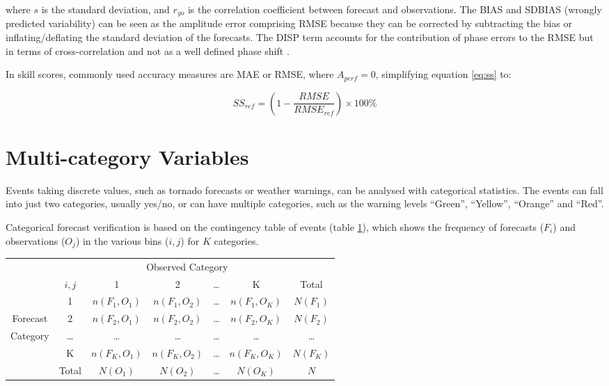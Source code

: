 where $s$ is the standard deviation, and $r_{yo}$ is the correlation coefficient between forecast and observations. The BIAS and SDBIAS (wrongly predicted variability) can be seen as the amplitude error comprising RMSE because they can be corrected by subtracting the bias or inflating/deflating the standard deviation of the forecasts. The DISP term accounts for the contribution of phase errors to the RMSE but in terms of cross-correlation and not as a well defined phase shift \citep{Lange2005}.

In skill scores, commonly used accuracy measures are MAE or RMSE, where $A_{perf}=0$, simplifying equation \ref{eq:ss} to:

\begin{equation}
    SS_{ref} = \left( 1 - \frac{RMSE}{RMSE_{ref}} \right) \times 100\%
    \label{eq:ss_rmse}
\end{equation}


\section{Multi-category Variables} 
\label{sec:verif_mcat}

Events taking discrete values, such as tornado forecasts or weather warnings, can be analysed with categorical statistics. The events can fall into just two categories, usually yes/no, or can have multiple categories, such as the warning levels ``Green'', ``Yellow'', ``Orange'' and ``Red''. 

Categorical forecast verification is based on the contingency table of events (table \ref{tb:ct_multi}), which shows the frequency of forecasts ($F_i$) and observations ($O_j$) in the various bins ($i,j$) for $K$ categories. 

\begin{table}[!htp]
\begin{center}
\begin{tabular}{cc|cccc|c}
\toprule
          &           & \multicolumn{4}{c}{Observed Category} &  \\ 
          &  $i,j$    & 1           & 2            & \ldots & K & Total\\  
\midrule
          & 1        & $n(F_1,O_1)$ & $n(F_1,O_2)$ & \ldots & $n(F_1,O_K)$ & $N(F_1)$ \\
 Forecast & 2        & $n(F_2,O_1)$ & $n(F_2,O_2)$ & \ldots & $n(F_2,O_K)$ & $N(F_2)$ \\
 Category & \ldots  & \ldots & \ldots & \ldots & \ldots & \ldots \\
          & K        & $n(F_K,O_1)$ & $n(F_K,O_2)$ & \ldots & $n(F_K,O_K)$ & $N(F_K)$ \\
\hline
          & Total    & $N(O_1)$ & $N(O_2)$ & \ldots & $N(O_K)$ & $N$ \\
\bottomrule
\end{tabular}
\label{tb:ct_multi}
\end{center}
\end{table}
\FloatBarrier

